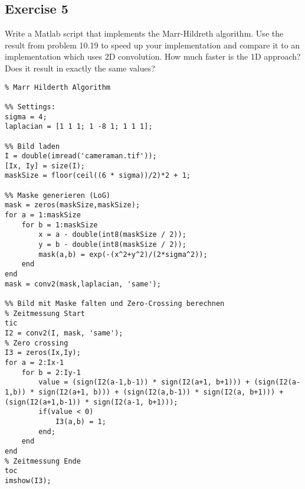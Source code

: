 \subsection{Exercise 5}
Write a Matlab script that implements the Marr-Hildreth algorithm. 
Use the result from problem 10.19 to speed up your implementation and compare it to an implementation which  uses 2D convolution.
How much faster is the 1D approach? Does it result in exactly the same values?

\begin{lstlisting}
% Marr Hilderth Algorithm

%% Settings:
sigma = 4;
laplacian = [1 1 1; 1 -8 1; 1 1 1];

%% Bild laden
I = double(imread('cameraman.tif'));
[Ix, Iy] = size(I);
maskSize = floor(ceil((6 * sigma))/2)*2 + 1;

%% Maske generieren (LoG)
mask = zeros(maskSize,maskSize);
for a = 1:maskSize
    for b = 1:maskSize
        x = a - double(int8(maskSize / 2));
        y = b - double(int8(maskSize / 2));
        mask(a,b) = exp(-(x^2+y^2)/(2*sigma^2));
    end
end
mask = conv2(mask,laplacian, 'same');

%% Bild mit Maske falten und Zero-Crossing berechnen
% Zeitmessung Start
tic
I2 = conv2(I, mask, 'same');
% Zero crossing
I3 = zeros(Ix,Iy);
for a = 2:Ix-1
    for b = 2:Iy-1
        value = (sign(I2(a-1,b-1)) * sign(I2(a+1, b+1))) + (sign(I2(a-1,b)) * sign(I2(a+1, b))) + (sign(I2(a,b-1)) * sign(I2(a, b+1))) + (sign(I2(a+1,b-1)) * sign(I2(a-1, b+1)));
        if(value < 0)
            I3(a,b) = 1;
        end;        
    end
end
% Zeitmessung Ende
toc
imshow(I3);
\end{lstlisting}
